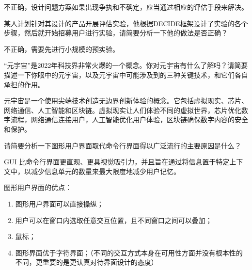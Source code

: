 \begin{solution}
不正确，设计问题方案如果出现争执和不确定，应当通过相应的评估手段来解决。
\end{solution}



\begin{problem}[2021]
某人计划针对其设计的产品开展评估实验，他根据DECIDE框架设计了实验的各个步骤，然后就开始招募用户进行实验，请简要分析一下他的做法是否正确？
\end{problem}

\begin{solution}
不正确，需要先进行小规模的预实验。
\end{solution}



\begin{problem}[2022]
“元宇宙”是2022年科技界非常火爆的一个概念。你对元宇宙有什么了解吗？请简要描述一下你眼中的元宇宙，以及元宇宙中可能涉及到的三种关键技术，和它们各自承担的作用。
\end{problem}

\begin{solution}
元宇宙是一个使用尖端技术创造无边界创新体验的概念。它包括虚拟现实、芯片、网络通信、人工智能和区块链。虚拟现实让人们体验不同的虚拟世界，芯片优化数字流程，网络通信连接用户，人工智能优化用户体验，区块链确保数字内容的安全和保护。
\end{solution}



\begin{problem}[2022]
请简要分析一下图形用户界面取代命令行界面得以广泛流行的主要原因是什么？
\end{problem}

\begin{solution}
GUI 比命令行界面更直观、更具视觉吸引力，并且旨在通过将信息置于特定上下文中，以减少信息单元的数量来最大限度地减少用户记忆。

图形用户界面的优点：
\begin{enumerate}[label=\arabic*.]
    \item 图形用户界面可以直接操纵；
    \item 用户可以在窗口内选取任意交互位置，且不同窗口之间可以叠加；
    \item 鼠标；
    \item 图形界面优于字符界面；（不同的交互方式本身在可用性方面并没有根本性的不同，更重要的是更认真对待界面设计的态度）
\end{enumerate}
\end{solution}



